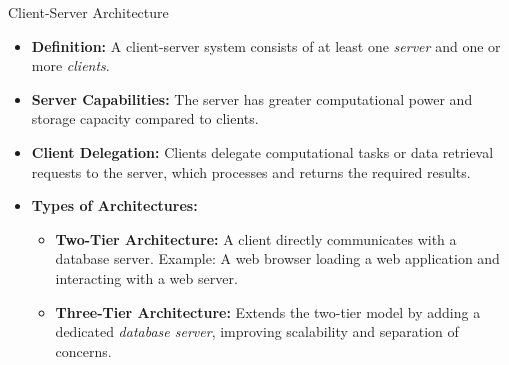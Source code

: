 \documentclass[aspectratio=169, table]{beamer}
\begin{document}
\begin{frame}{Client-Server Architecture}
	\begin{itemize}
		\item \textbf{Definition:} A client-server system consists of at least one \textit{server} and one or more \textit{clients}.
		\item \textbf{Server Capabilities:} The server has greater computational power and storage capacity compared to clients.
		\item \textbf{Client Delegation:} Clients delegate computational tasks or data retrieval requests to the server, which processes and returns the required results.
		\item \textbf{Types of Architectures:}
		\begin{itemize}
			\item \textbf{Two-Tier Architecture:} A client directly communicates with a database server. Example: A web browser loading a web application and interacting with a web server.
			\item \textbf{Three-Tier Architecture:} Extends the two-tier model by adding a dedicated \textit{database server}, improving scalability and separation of concerns.
		\end{itemize}
	\end{itemize}
\end{frame}
\end{document}
